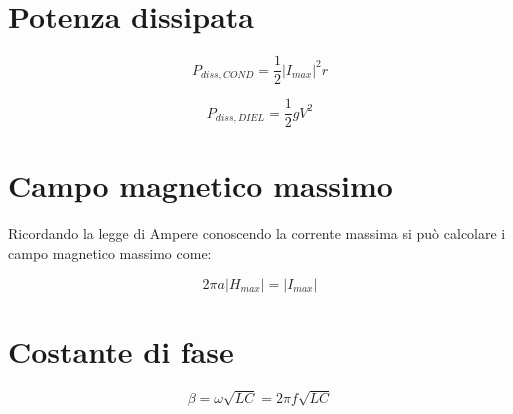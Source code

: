 	\section{Potenza dissipata}

			\begin{equation}
			P_{diss,COND}=\frac{1}{2}|I_{max}|^2 r
			\end{equation}

			\begin{equation}
			P_{diss,DIEL}=\frac{1}{2} g V^2
			\end{equation}

	\section{Campo magnetico massimo}
	
 			Ricordando la legge di Ampere conoscendo la corrente massima si può calcolare i campo magnetico massimo come:

			\begin{equation}
			2 \pi a |H_{max}| = |I_{max}|
			\end{equation}

	\section{Costante di fase}
			\begin{equation}
				\beta=\omega \sqrt{LC}=2 \pi f \sqrt{LC}
			\end{equation}
